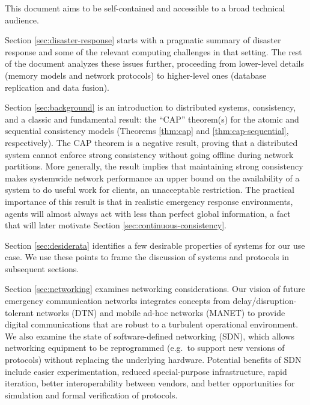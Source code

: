 \documentclass[]             %
{NASA}                       %
\theoremstyle{definition}
\begin{document}
This document aims to be self-contained and accessible to a broad
technical audience.

Section \ref{sec:disaster-response} starts with a pragmatic summary of
disaster response and some of the relevant computing challenges in that
setting. The rest of the document analyzes these issues further,
proceeding from lower-level details (memory models and network
protocols) to higher-level ones (database replication and data fusion).

Section \ref{sec:background} is an introduction to distributed systems,
consistency, and a classic and fundamental result: the ``CAP''
theorem(s) for the atomic and sequential consistency models (Theorems
\ref{thm:cap} and \ref{thm:cap-sequential}, respectively). The CAP
theorem is a negative result, proving that a distributed system cannot
enforce strong consistency without going offline during network
partitions. More generally, the result implies that maintaining strong
consistency makes systemwide network performance an upper bound on the
availability of a system to do useful work for clients, an unacceptable
restriction. The practical importance of this result is that in
realistic emergency response environments, agents will almost always act
with less than perfect global information, a fact that will later
motivate Section \ref{sec:continuous-consistency}.

Section \ref{sec:desiderata} identifies a few desirable properties of
systems for our use case. We use these points to frame the discussion of
systems and protocols in subsequent sections.

Section \ref{sec:networking} examines networking considerations. Our
vision of future emergency communication networks integrates concepts
from delay/disruption-tolerant networks (DTN) and mobile ad-hoc networks
(MANET) to provide digital communications that are robust to a turbulent
operational environment. We also examine the state of software-defined
networking (SDN), which allows networking equipment to be reprogrammed
(e.g.~to support new versions of protocols) without replacing the
underlying hardware. Potential benefits of SDN include easier
experimentation, reduced special-purpose infrastructure, rapid
iteration, better interoperability between vendors, and better
opportunities for simulation and formal verification of protocols.
\end{document}
